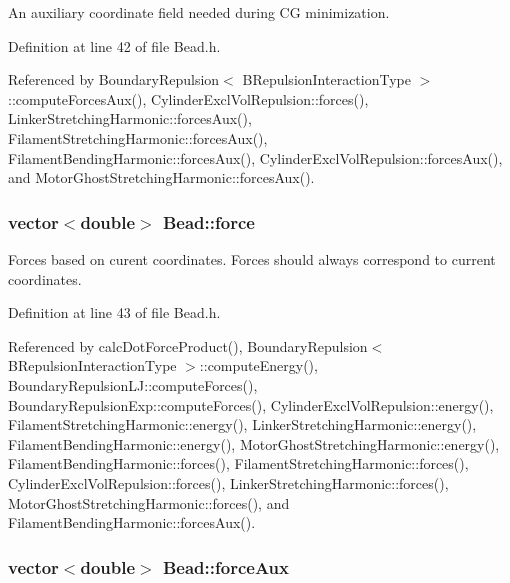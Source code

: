 An auxiliary coordinate field needed during C\+G minimization. 



Definition at line 42 of file Bead.\+h.



Referenced by Boundary\+Repulsion$<$ B\+Repulsion\+Interaction\+Type $>$\+::compute\+Forces\+Aux(), Cylinder\+Excl\+Vol\+Repulsion\+::forces(), Linker\+Stretching\+Harmonic\+::forces\+Aux(), Filament\+Stretching\+Harmonic\+::forces\+Aux(), Filament\+Bending\+Harmonic\+::forces\+Aux(), Cylinder\+Excl\+Vol\+Repulsion\+::forces\+Aux(), and Motor\+Ghost\+Stretching\+Harmonic\+::forces\+Aux().

\hypertarget{classBead_afc556d77d1d80e11c1256e89bba0db66}{
\subsubsection[{force}]{\setlength{\rightskip}{0pt plus 5cm}vector$<$double$>$ Bead\+::force}}\label{classBead_afc556d77d1d80e11c1256e89bba0db66}


Forces based on curent coordinates. Forces should always correspond to current coordinates. 



Definition at line 43 of file Bead.\+h.



Referenced by calc\+Dot\+Force\+Product(), Boundary\+Repulsion$<$ B\+Repulsion\+Interaction\+Type $>$\+::compute\+Energy(), Boundary\+Repulsion\+L\+J\+::compute\+Forces(), Boundary\+Repulsion\+Exp\+::compute\+Forces(), Cylinder\+Excl\+Vol\+Repulsion\+::energy(), Filament\+Stretching\+Harmonic\+::energy(), Linker\+Stretching\+Harmonic\+::energy(), Filament\+Bending\+Harmonic\+::energy(), Motor\+Ghost\+Stretching\+Harmonic\+::energy(), Filament\+Bending\+Harmonic\+::forces(), Filament\+Stretching\+Harmonic\+::forces(), Cylinder\+Excl\+Vol\+Repulsion\+::forces(), Linker\+Stretching\+Harmonic\+::forces(), Motor\+Ghost\+Stretching\+Harmonic\+::forces(), and Filament\+Bending\+Harmonic\+::forces\+Aux().

\hypertarget{classBead_a59758227cd7afbb3ec5fbcafe32773b8}{
\subsubsection[{force\+Aux}]{\setlength{\rightskip}{0pt plus 5cm}vector$<$double$>$ Bead\+::force\+Aux}}\label{classBead_a59758227cd7afbb3ec5fbcafe32773b8}



